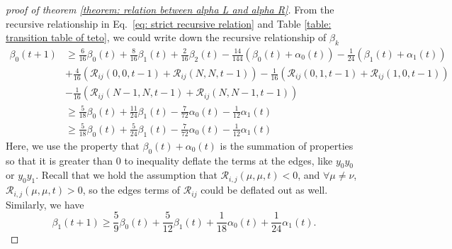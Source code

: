 \documentclass{article}
\begin{document}
\begin{proof}[proof of theorem \ref{theorem: relation between alpha L and alpha R}]
   From the recursive relationship in Eq.~\eqref{eq: strict recursive relation} and Table \ref{table: transition table of teto}, we could write down the recursive relationship of $\beta_k$
   \begin{align}
    \beta_0(t+1) & \geq \frac{6}{16} \beta_0(t)+\frac{8}{16} \beta_1(t) + \frac{2}{16}\beta_2(t)-\frac{14}{144}\left(\beta_0(t)+\alpha_0(t)\right)-\frac{1}{24}\left(\beta_1(t)+\alpha_1(t)\right)\nonumber\\
    & + \frac{4}{16}(\mathscr{R}_{i j}(0,0, t-1) + \mathscr{R}_{i j}(N,N, t-1)) -  \frac{1}{16}(\mathscr{R}_{i j}(0,1, t-1) + \mathscr{R}_{i j}(1,0, t-1))\nonumber\\
    &- \frac{1}{16}(\mathscr{R}_{i j}(N-1,N, t-1) + \mathscr{R}_{i j}(N,N-1, t-1))\nonumber\\
    & \geq \frac{5}{18} \beta_0(t)+\frac{11}{24} \beta_1(t)-\frac{7}{72} \alpha_0(t)-\frac{1}{12} \alpha_1(t) \\
    & \geq \frac{5}{18} \beta_0(t)+\frac{5}{24} \beta_1(t)-\frac{7}{72} \alpha_0(t)-\frac{1}{12} \alpha_1(t) 
    \end{align}
    Here, we use the property that $\beta_0(t)+\alpha_0(t)$ is the summation of properties so that it is greater than $0$ to inequality deflate the terms at the edges, like $y_0y_0$ or $ y_0y_1$. Recall that we hold the assumption that $\mathscr{R}_{i, j}(\mu, \mu, t)<0$, and $\forall \mu \neq \nu$, $\mathscr{R}_{i, j}(\mu, \mu, t)>0$, so the edges terms of $\mathscr{R}_{i j}$ could be deflated out as well. Similarly, we have
    \begin{equation}
        \beta_1(t+1)  \geq \frac{5}{9} \beta_0(t)+\frac{5}{12} \beta_1(t)+\frac{1}{18} \alpha_0(t)+\frac{1}{24} \alpha_1(t).
    \end{equation}
    

\end{proof}
\end{document}
